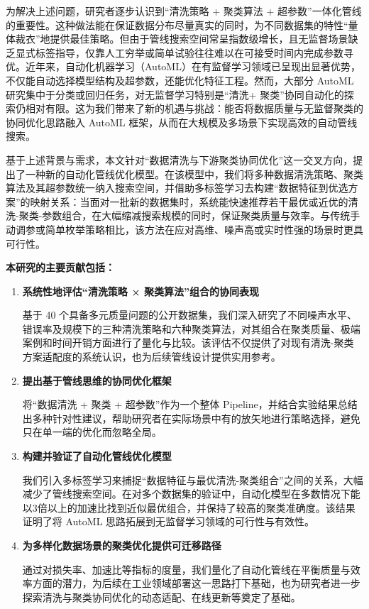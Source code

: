 \documentclass[10pt]{article} %
\numberwithin{equation}{section}
\begin{document}
为解决上述问题，研究者逐步认识到“清洗策略 + 聚类算法 + 超参数”一体化管线的重要性\cite{Blumenberg2020, BOLANOSMARTINEZ2024102164}。这种做法能在保证数据分布尽量真实的同时，为不同数据集的特性“量体裁衣”地提供最佳策略。但由于管线搜索空间常呈指数级增长，且无监督场景缺乏显式标签指导，仅靠人工穷举或简单试验往往难以在可接受时间内完成参数寻优。近年来，自动化机器学习（AutoML）在有监督学习领域已呈现出显著优势，不仅能自动选择模型结构及超参数，还能优化特征工程\cite{SALEHIN202452}。然而，大部分 AutoML 研究集中于分类或回归任务，对无监督学习特别是“清洗+ 聚类”协同自动化的探索仍相对有限\cite{Bahmani2021ToTune, 9458702}。这为我们带来了新的机遇与挑战：能否将数据质量与无监督聚类的协同优化思路融入 AutoML 框架，从而在大规模及多场景下实现高效的自动管线搜索。

基于上述背景与需求，本文针对“数据清洗与下游聚类协同优化”这一交叉方向，提出了一种新的自动化管线优化模型。在该模型中，我们将多种数据清洗策略、聚类算法及其超参数统一纳入搜索空间，并借助多标签学习去构建“数据特征到优选方案”的映射关系：当面对一批新的数据集时，系统能快速推荐若干最优或近优的清洗-聚类-参数组合，在大幅缩减搜索规模的同时，保证聚类质量与效率。与传统手动调参或简单枚举策略相比，该方法在应对高维、噪声高或实时性强的场景时更具可行性。

\textbf{本研究的主要贡献包括：}
\begin{enumerate}
    \item \textbf{系统性地评估“清洗策略 × 聚类算法”组合的协同表现}

    基于 40 个具备多元质量问题的公开数据集，我们深入研究了不同噪声水平、错误率及规模下的三种清洗策略和六种聚类算法，对其组合在聚类质量、极端案例和时间开销方面进行了量化与比较。该评估不仅提供了对现有清洗-聚类方案适配度的系统认识，也为后续管线设计提供实用参考。
    \item \textbf{提出基于管线思维的协同优化框架}

    将“数据清洗 + 聚类 + 超参数”作为一个整体 Pipeline，并结合实验结果总结出多种针对性建议，帮助研究者在实际场景中有的放矢地进行策略选择，避免只在单一端的优化而忽略全局。
    \item \textbf{构建并验证了自动化管线优化模型}

    我们引入多标签学习来捕捉“数据特征与最优清洗-聚类组合”之间的关系，大幅减少了管线搜索空间。在对多个数据集的验证中，自动化模型在多数情况下能以3倍以上的加速比找到近似最优组合，并保持了较高的聚类准确度。该结果证明了将 AutoML 思路拓展到无监督学习领域的可行性与有效性。
    \item \textbf{为多样化数据场景的聚类优化提供可迁移路径}

    通过对损失率、加速比等指标的度量，我们量化了自动化管线在平衡质量与效率方面的潜力，为后续在工业领域部署这一思路打下基础，也为研究者进一步探索清洗与聚类协同优化的动态适配、在线更新等奠定了基础。

\end{enumerate}
\end{document}

